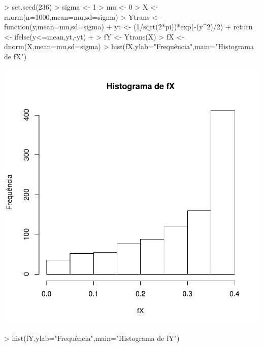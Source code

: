 \documentclass{article}
\begin{document}
\begin{enumerate}
\begin{enumerate}
\begin{Schunk}
\begin{Sinput}
> set.seed(236)
> sigma <- 1
> mu <- 0
> X <- rnorm(n=1000,mean=mu,sd=sigma)
> Ytrans <- function(y,mean=mu,sd=sigma){
+   yt <- (1/sqrt(2*pi))*exp(-(y^2)/2)
+   return <- ifelse(y<=mean,yt,-yt)
+ } 
> fY <- Ytrans(X)
> fX <- dnorm(X,mean=mu,sd=sigma)
> hist(fX,ylab="Frequência",main="Histograma de fX")
\end{Sinput}
\end{Schunk}
\includegraphics{transformacao-001}
\begin{Schunk}
\begin{Sinput}
> hist(fY,ylab="Frequência",main="Histograma de fY")
\end{Sinput}
\end{Schunk}

\end{enumerate}
\end{enumerate}
\end{document}
